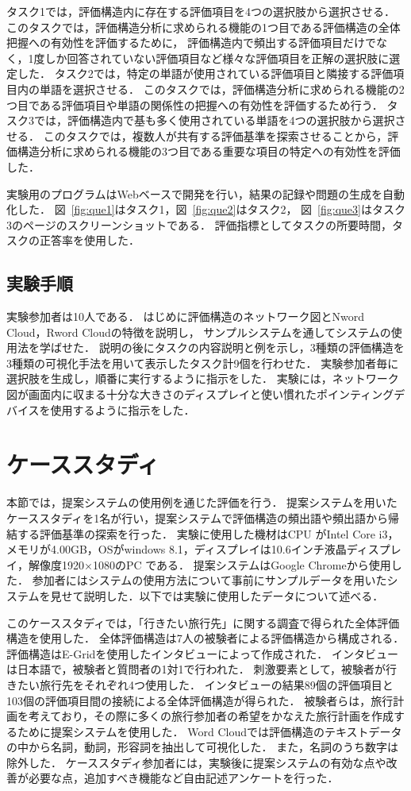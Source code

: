 \documentclass[syuuron]{kuee}
\begin{document}
			タスク1では，評価構造内に存在する評価項目を4つの選択肢から選択させる．
			このタスクでは，評価構造分析に求められる機能の1つ目である評価構造の全体把握への有効性を評価するために，
			評価構造内で頻出する評価項目だけでなく，1度しか回答されていない評価項目など様々な評価項目を正解の選択肢に選定した．
			タスク2では，特定の単語が使用されている評価項目と隣接する評価項目内の単語を選択させる．
			このタスクでは，評価構造分析に求められる機能の2つ目である評価項目や単語の関係性の把握への有効性を評価するため行う．
			タスク3では，評価構造内で基も多く使用されている単語を4つの選択肢から選択させる．
			このタスクでは，複数人が共有する評価基準を探索させることから，評価構造分析に求められる機能の3つ目である重要な項目の特定への有効性を評価した．
			
			実験用のプログラムはWebベースで開発を行い，結果の記録や問題の生成を自動化した．
			図~\ref{fig:que1}はタスク1，図~\ref{fig:que2}はタスク2，
			図~\ref{fig:que3}はタスク3のページのスクリーンショットである．
			評価指標としてタスクの所要時間，タスクの正答率を使用した．
		
		\subsection{実験手順}
			実験参加者は10人である．
			はじめに評価構造のネットワーク図とNword Cloud，Rword Cloudの特徴を説明し，
			サンプルシステムを通してシステムの使用法を学ばせた．
			説明の後にタスクの内容説明と例を示し，3種類の評価構造を3種類の可視化手法を用いて表示したタスク計9個を行わせた．
			実験参加者毎に選択肢を生成し，順番に実行するように指示をした．
			実験には，ネットワーク図が画面内に収まる十分な大きさのディスプレイと使い慣れたポインティングデバイスを使用するように指示をした．
		
	\section{ケーススタディ}
		本節では，提案システムの使用例を通じた評価を行う．
		提案システムを用いたケーススタディを1名が行い，提案システムで評価構造の頻出語や頻出語から帰結する評価基準の探索を行った．
		実験に使用した機材はCPU がIntel Core i3，メモリが4.00GB，OSがwindows 8.1，ディスプレイは10.6インチ液晶ディスプレイ，解像度1920×1080のPC である．
		提案システムはGoogle Chromeから使用した．
		参加者にはシステムの使用方法について事前にサンプルデータを用いたシステムを見せて説明した．以下では実験に使用したデータについて述べる．
		
		このケーススタディでは，「行きたい旅行先」に関する調査で得られた全体評価構造を使用した．
		全体評価構造は7人の被験者による評価構造から構成される．
		評価構造はE-Gridを使用したインタビューによって作成された．
		インタビューは日本語で，被験者と質問者の1対1で行われた．
		刺激要素として，被験者が行きたい旅行先をそれぞれ4つ使用した．
		インタビューの結果89個の評価項目と103個の評価項目間の接続による全体評価構造が得られた．
		被験者らは，旅行計画を考えており，その際に多くの旅行参加者の希望をかなえた旅行計画を作成するために提案システムを使用した．
		Word Cloudでは評価構造のテキストデータの中から名詞，動詞，形容詞を抽出して可視化した．
		また，名詞のうち数字は除外した．
		ケーススタディ参加者には，実験後に提案システムの有効な点や改善が必要な点，追加すべき機能など自由記述アンケートを行った．
		
\end{document}
